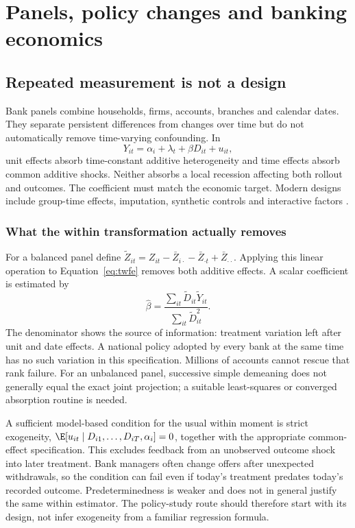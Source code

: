 \chapter{Panels, policy changes and banking economics}\label{ch:panels}
\section{Repeated measurement is not a design}
Bank panels combine households, firms, accounts, branches and calendar dates.
They separate persistent differences from changes over time but do not
automatically remove time-varying confounding. In
\begin{equation}
 Y_{it}=\alpha_i+\lambda_t+\beta D_{it}+u_{it},
 \label{eq:twfe}
\end{equation}
unit effects absorb time-constant additive heterogeneity and time effects
absorb common additive shocks. Neither absorbs a local recession affecting
both rollout and outcomes. The coefficient must match the economic target.
Modern designs include group-time effects, imputation, synthetic controls
and interactive factors \citep{panelreview2024,roth2023}.

\subsection{What the within transformation actually removes}
For a balanced panel define
$\widetilde Z_{it}=Z_{it}-\bar Z_{i\cdot}-\bar Z_{\cdot t}
+\bar Z_{\cdot\cdot}$. Applying this linear operation to
Equation~\eqref{eq:twfe} removes both additive effects. A scalar coefficient
is estimated by
\begin{equation}
 \widehat\beta=
 \frac{\sum_{it}\widetilde D_{it}\widetilde Y_{it}}
      {\sum_{it}\widetilde D_{it}^{2}}.
 \label{eq:within}
\end{equation}
The denominator shows the source of information: treatment variation left
after unit and date effects. A national policy adopted by every bank at the
same time has no such variation in this specification. Millions of accounts
cannot rescue that rank failure. For an unbalanced panel, successive simple
demeaning does not generally equal the exact joint projection; a suitable
least-squares or converged absorption routine is needed.

A sufficient model-based condition for the usual within moment is strict
exogeneity, $\E[u_{it}\mid D_{i1},\ldots,D_{iT},\alpha_i]=0$,
together with the appropriate common-effect specification. This excludes
feedback from an unobserved outcome shock into later treatment. Bank
managers often change offers after unexpected withdrawals, so the condition
can fail even if today's treatment predates today's recorded outcome.
Predeterminedness is weaker and does not in general justify the same within
estimator. The policy-study route should therefore start with its design,
not infer exogeneity from a familiar regression formula.

